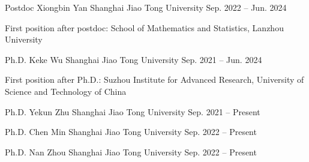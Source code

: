 
\begin{cventries}

  \cventry
  {Postdoc} %
  {Xiongbin Yan} %
  {Shanghai Jiao Tong University} %
  {Sep. 2022 -- Jun. 2024} %
  {
    \begin{cvitems} %
    \item {First position after postdoc: School of Mathematics and Statistics, Lanzhou University}
    \end{cvitems}
  }

  \cventry
  {Ph.D.} %
  {Keke Wu} %
  {Shanghai Jiao Tong University} %
  {Sep. 2021 -- Jun. 2024} %
  {
    \begin{cvitems} %
    \item {First position after Ph.D.: Suzhou Institute for Advanced Research, University of Science and Technology of China}
    \end{cvitems}
  }
\end{cventries}

\begin{cventries}

  \cventry
  {Ph.D.} %
  {Yekun Zhu} %
  {Shanghai Jiao Tong University} %
  {Sep. 2021 -- Present} %
  {}

  \cventry
  {Ph.D.} %
  {Chen Min} %
  {Shanghai Jiao Tong University} %
  {Sep. 2022 -- Present} %
  {}

  \cventry
  {Ph.D.} %
  {Nan Zhou} %
  {Shanghai Jiao Tong University} %
  {Sep. 2022 -- Present} %
  {}

\end{cventries}
